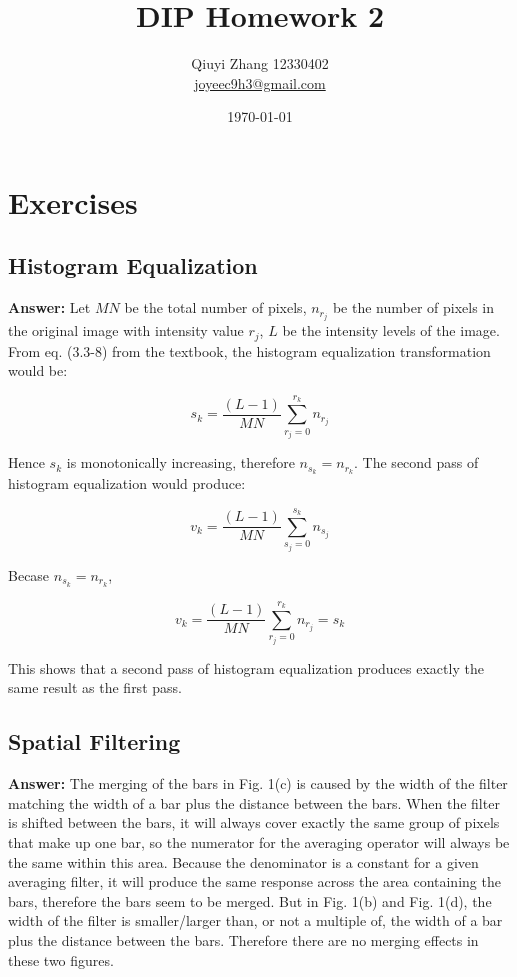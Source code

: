 \documentclass{article}
\begin{document}
\title{DIP Homework 2}
\author{Qiuyi Zhang 12330402 \\ \href{mailto:joyeec9h3@gmail.com}{joyeec9h3@gmail.com}} 
\date{\today}
\maketitle
\tableofcontents
\section{Exercises}

\subsection{Histogram Equalization}

\textbf{Answer:} 
Let $MN$ be the total number of pixels, $n_{r_j}$ be the number of pixels in the original image with intensity value $r_j$, $L$ be the intensity levels of the image. From eq. (3.3-8) from the textbook, the histogram equalization transformation would be:

$$s_k = \frac{(L-1)}{MN}\sum_{r_j=0}^{r_k}n_{r_j}$$

Hence $s_k$ is monotonically increasing, therefore $n_{s_k} = n_{r_k}$. The second pass of histogram equalization would produce:

$$v_k =  \frac{(L-1)}{MN}\sum_{s_j=0}^{s_k}n_{s_j}$$

Becase $n_{s_k} = n_{r_k}$, 

$$v_k =  \frac{(L-1)}{MN}\sum_{r_j=0}^{r_k}n_{r_j} = s_k$$

This shows that a second pass of histogram equalization produces exactly the same result as the first pass.

\subsection{Spatial Filtering}

\textbf{Answer:}
The merging of the bars in Fig. 1(c) is caused by the width of the filter matching the width of a bar plus the distance between the bars. When the filter is shifted between the bars, it will always cover exactly the same group of pixels that make up one bar, so the numerator for the averaging operator will always be the same within this area. Because the denominator is a constant for a given averaging filter, it will produce the same response across the area containing the bars, therefore the bars seem to be merged. But in Fig. 1(b) and Fig. 1(d), the width of the filter is smaller/larger than, or not a multiple of, the width of a bar plus the distance between the bars. Therefore there are no merging effects in these two figures.
\end{document}
